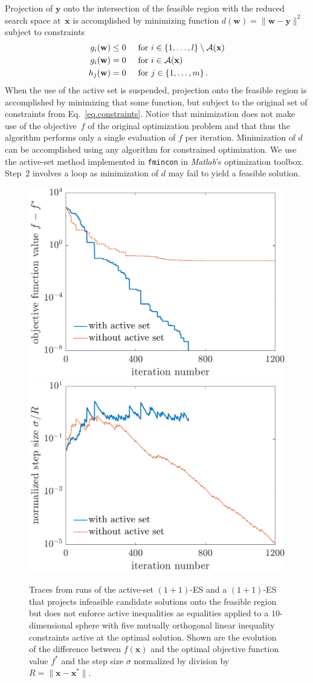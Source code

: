 \documentclass[oribibl]{llncs}
\newcommand{\w}{\ensuremath{\mathbf{w}}}
\newcommand{\x}{\ensuremath{\mathbf{x}}}
\newcommand{\y}{\ensuremath{\mathbf{y}}}
\begin{document}
Projection of $\y$ onto the intersection of the feasible region with the reduced search space at~$\x$ is accomplished by minimizing function $d(\w)= \|\w-\y\|^2$ subject to constraints
\begin{align*}
  g_i(\w)&\leq0\hspace{5mm}\text{for $i\in\{1,\dots,l\}\setminus\mathcal{A}(\x)$}\\
  g_i(\w)&=0\hspace{5mm}\text{for $i\in\mathcal{A}(\x)$}\\
  h_j(\w)&=0\hspace{5mm}\text{for $j\in\{1,\dots,m\}$}\,.
\end{align*}
When the use of the active set is suspended, projection onto the feasible region is accomplished by minimizing that some function, but subject to the original set of constraints from Eq.~\eqref{eq.constraints}. Notice that minimization does not make use of the objective~$f$ of the original optimization problem and that thus the algorithm performs only a single evaluation of $f$ per iteration. Minimization of $d$ can be accomplished using any algorithm for constrained optimization. We use the active-set method implemented in \texttt{fmincon} in \textsl{Matlab}'s optimization toolbox. Step~2 involves a loop as minimization of $d$ may fail to yield a feasible solution.

\begin{figure}[t]
  \begin{minipage}{\linewidth}
    \includegraphics[width=.48\linewidth]{figures/sphere1}
    \hfill
    \includegraphics[width=.48\linewidth]{figures/sphere2}
  \end{minipage}
  \caption{\label{fig.sphere}Traces from runs of the active-set $(1+1)$-ES and a $(1+1)$-ES that projects infeasible candidate solutions onto the feasible region but does not enforce active inequalities as equalities applied to a $10$-dimensional sphere with five mutually orthogonal linear inequality constraints active at the optimal solution. Shown are the evolution of the difference between $f(\x)$ and the optimal objective function value $f^*$ and the step size $\sigma$ normalized by division by $R=\|\x-\x^*\|$.}
\end{figure}
\end{document}
